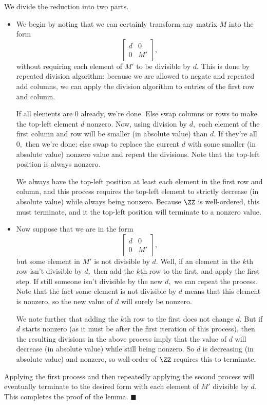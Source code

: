 We divide the reduction into two parts.
\begin{itemize}
    \item We begin by noting that we can certainly transform any matrix $M$ into the form
    \[\begin{bmatrix}
        d & 0 \\
        0 & M'
    \end{bmatrix},\]
    without requiring each element of $M'$ to be divisible by $d.$ This is done by repeated division algorithm: because we are allowed to negate and repeated add columns, we can apply the division algorithm to entries of the first row and column.
    
    If all elements are $0$ already, we're done. Else swap columns or rows to make the top-left element $d$ nonzero. Now, using division by $d,$ each element of the first column and row will be smaller (in absolute value) than $d.$ If they're all $0,$ then we're done; else swap to replace the current $d$ with some smaller (in absolute value) nonzero value and repeat the divisions. Note that the top-left position is always nonzero.
    
    We always have the top-left position at least each element in the first row and column, and this process requires the top-left element to strictly decrease (in absolute value) while always being nonzero. Because $\ZZ$ is well-ordered, this must terminate, and it the top-left position will terminate to a nonzero value.
    \item Now suppose that we are in the form
    \[\begin{bmatrix}
        d & 0 \\
        0 & M'
    \end{bmatrix},\]
    but some element in $M'$ is not divisible by $d.$ Well, if an element in the $k$th row isn't divisible by $d,$ then add the $k$th row to the first, and apply the first step. If still someone isn't divisible by the new $d,$ we can repeat the process. Note that the fact some element is not divisible by $d$ means that this element is nonzero, so the new value of $d$ will surely be nonzero.
    
    We note further that adding the $k$th row to the first does not change $d.$ But if $d$ starts nonzero (as it must be after the first iteration of this process), then the resulting divisions in the above process imply that the value of $d$ will decrease (in absolute value) while still being nonzero. So $d$ is decreasing (in absolute value) and nonzero, so well-order of $\ZZ$ requires this to terminate.
\end{itemize}
Applying the first process and then repeatedly applying the second process will eventually terminate to the desired form with each element of $M'$ divisible by $d.$ This completes the proof of the lemma. $\blacksquare$

